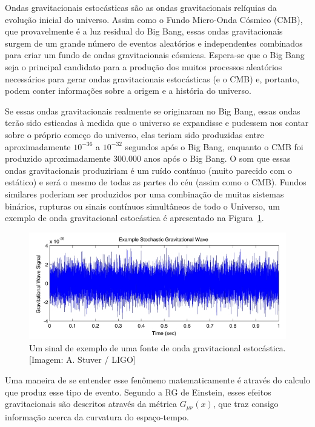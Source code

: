 Ondas gravitacionais estocásticas são as ondas gravitacionais relíquias da evolução inicial do universo. Assim como o Fundo Micro-Onda Cósmico (CMB), que provavelmente é a luz residual do Big Bang, essas ondas gravitacionais surgem de um grande número de eventos aleatórios e independentes combinados para criar um fundo de ondas gravitacionais cósmicas. Espera-se que o Big Bang seja o principal candidato para a produção dos muitos processos aleatórios necessários para gerar ondas gravitacionais estocásticas (e o CMB) e, portanto, podem conter informações sobre a origem e a história do universo. 

Se essas ondas gravitacionais realmente se originaram no Big Bang, essas ondas terão sido esticadas à medida que o universo se expandisse e pudessem nos contar sobre o próprio começo do universo, elas teriam sido produzidas entre aproximadamente \(10^{-36}\) a \(10^{-32}\) segundos após o Big Bang, enquanto o CMB foi produzido aproximadamente 300.000 anos após o Big Bang. O som que essas ondas gravitacionais produziriam é um ruído contínuo (muito parecido com o estático) e será o mesmo de todas as partes do céu (assim como o CMB). Fundos similares poderiam ser produzidos por uma combinação de muitas sistemas binários, rupturas ou sinais contínuos simultâneos de todo o Universo, um exemplo de onda gravitacional estocástica é apresentado na Figura~\ref{figondaestocastica}.

\begin{figure}[ht]
\centering
\includegraphics[width=.9\textwidth]{figuras/stochastic_tn.jpg}
\caption{Um sinal de exemplo de uma fonte de onda gravitacional estocástica. [Imagem: A. Stuver / LIGO]}
\label{figondaestocastica}
\end{figure}

Uma maneira de se entender esse fenômeno matematicamente é através do calculo que produz esse tipo de evento. Segundo a RG de Einstein, esses efeitos gravitacionais são descritos através da métrica $G_{\mu \nu}(x)$, que traz consigo informação acerca da curvatura do espaço-tempo.

